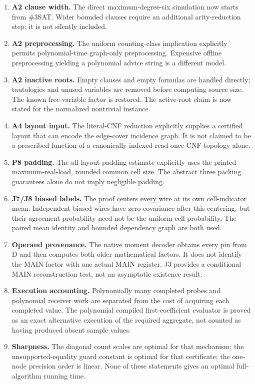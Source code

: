 \documentclass[
  11pt,
]{article}
\providecommand{\tightlist}{%
  \setlength{\itemsep}{0pt}\setlength{\parskip}{0pt}}
\begin{document}
\begin{enumerate}
\def\labelenumi{\arabic{enumi}.}
\tightlist
\item
  \textbf{A2 clause width.} The direct maximum-degree-six simulation now
  starts from \#3SAT. Wider bounded clauses require an additional
  arity-reduction step; it is not silently included.
\item
  \textbf{A2 preprocessing.} The uniform counting-class implication
  explicitly permits polynomial-time graph-only preprocessing. Expensive
  offline preprocessing yielding a polynomial advice string is a
  different model.
\item
  \textbf{A2 inactive roots.} Empty clauses and empty formulas are
  handled directly; tautologies and unused variables are removed before
  computing source size. The known free-variable factor is restored. The
  active-root claim is now stated for the normalized nontrivial
  instance.
\item
  \textbf{A4 layout input.} The literal-CNF reduction explicitly
  supplies a certified layout that can encode the edge-cover incidence
  graph. It is not claimed to be a prescribed function of a canonically
  indexed read-once CNF topology alone.
\item
  \textbf{P8 padding.} The all-layout padding estimate explicitly uses
  the printed maximum-real-load, rounded common cell size. The abstract
  three packing guarantees alone do not imply negligible padding.
\item
  \textbf{J7/J8 biased labels.} The proof centers every wire at its own
  cell-indicator mean. Independent biased wires have zero covariance
  after this centering, but their agreement probability need not be the
  uniform-cell probability. The paired mean identity and bounded
  dependency graph are both used.
\item
  \textbf{Operand provenance.} The native moment decoder obtains every
  pin from D and then computes both older mathematical factors. It does
  not identify the MAIN factor with one actual MAIN register. J3
  provides a conditional MAIN reconstruction test, not an asymptotic
  existence result.
\item
  \textbf{Execution accounting.} Polynomially many completed probes and
  polynomial receiver work are separated from the cost of acquiring each
  completed value. The polynomial compiled first-coefficient evaluator
  is proved as an exact alternative execution of the required aggregate,
  not counted as having produced absent sample values.
\item
  \textbf{Sharpness.} The diagonal count scales are optimal for that
  mechanism; the unsupported-equality guard constant is optimal for that
  certificate; the one-node precision order is linear. None of these
  statements gives an optimal full-algorithm running time.
\end{enumerate}
\end{document}
